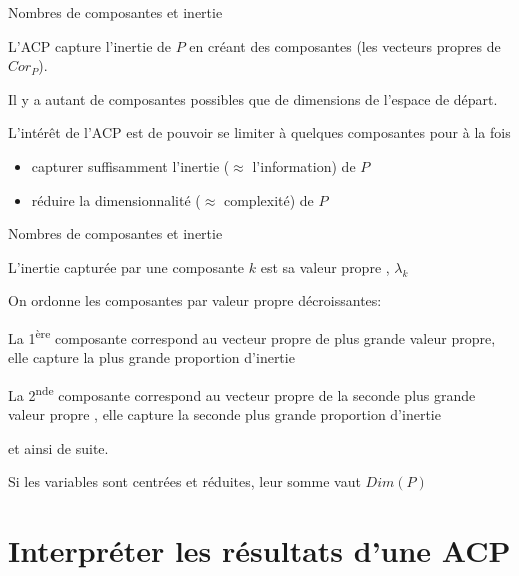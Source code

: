 \documentclass{beamer}
\begin{document}
\begin{frame}{Nombres de composantes et inertie}

L'ACP capture l'inertie de $P$ en créant des composantes (les vecteurs propres de  $Cor_P$). 

\medskip

Il y a autant de composantes possibles que de dimensions de l'espace de départ. 

\medskip  


L'intérêt de l'ACP est de pouvoir se limiter à \alert{quelques} composantes  pour à la fois 
\begin{itemize}
\item  capturer suffisamment l'inertie ($\approx$ l'information) de $P$
\item  réduire la dimensionnalité ($\approx$ complexité) de $P$
\end{itemize}

\end{frame}


\begin{frame}{Nombres de composantes et inertie}


L'inertie capturée par une composante $k$ est sa valeur propre , $\lambda_k$

On ordonne les composantes par valeur propre décroissantes:

La 1\textsuperscript{ère} composante correspond au vecteur propre de plus grande valeur propre, elle capture la plus grande proportion d'inertie

La 2\textsuperscript{nde} composante correspond au  vecteur propre de la seconde plus grande valeur propre , elle capture la seconde plus grande proportion d'inertie 

\medskip

et ainsi de suite.

\medskip


Si les variables sont centrées et réduites, leur somme vaut $Dim(P)$ 


\end{frame}




\section{Interpréter les résultats d'une ACP}
\end{document}
